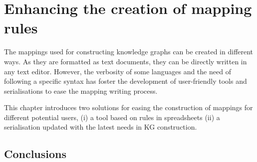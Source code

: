 
\chapter{Enhancing the creation of mapping rules}
\label{chapter:creation}

The mappings used for constructing knowledge graphs can be created in different ways. As they are formatted as text documents, they can be directly written in any text editor. However, the verbosity of some languages and the need of following a specific syntax has foster the development of user-friendly tools and serialisations to ease the mapping writing process.

This chapter introduces two solutions for easing the construction of mappings for different potential users, (i) a tool based on rules in spreadsheets (ii) a serialisation updated with the latest needs in KG construction.





\section{Conclusions}